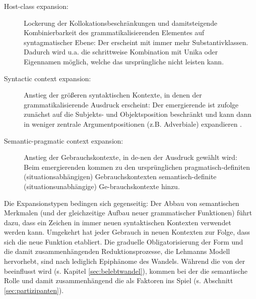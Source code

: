 \begin{description}
\item[Host-class expansion:] Lockerung der Kollokationsbeschränkungen und damit\linebreak steigende Kombinierbarkeit des grammatikalisierenden Elementes auf syntagmatischer Ebene: Der  erscheint mit immer mehr Substantivklassen. Dadurch wird u.a. die schrittweise Kombination mit Unika  oder Eigennamen  möglich, welche das ursprüngliche  nicht leisten kann. 
\item[Syntactic context expansion:] Anstieg  der größeren syntaktischen Kontexte, in denen der grammatikalisierende Ausdruck erscheint: Der emergierende  ist \textcite[32]{Himmelmann2004} zufolge zunächst auf die Subjekts-  und Objektsposition   beschränkt und kann dann in weniger zentrale Argumentpositionen (z.B. Adverbiale)  expandieren  \parencite[s. hierzu auch ausführlich][]{Himmelmann1998}. 
\item[Semantic-pragmatic context expansion:] Anstieg  der Gebrauchskontexte, in de-\linebreak nen der Ausdruck gewählt wird: Beim emergierenden  kommen zu den ursprünglichen pragmatisch-definiten (situationsabhängigen) Gebrauchskontexten semantisch-definite (situationsunabhängige) Ge-\linebreak brauchskontexte hinzu.   

 
\end{description}

\noindent
Die Expansionstypen  bedingen sich gegenseitig: Der Abbau von semantischen Merkmalen (und der gleichzeitige Aufbau neuer grammatischer Funktionen) führt dazu, dass ein Zeichen in immer neuen syntaktischen Kontexten verwendet werden kann. Umgekehrt hat jeder Gebrauch in neuen Kontexten zur Folge, dass sich die neue Funktion etabliert. Die graduelle Obligatorisierung der Form und die damit zusammenhängenden Reduktionsprozesse, die Lehmanns Modell hervorhebt, sind nach \textcite[33]{Himmelmann2004} lediglich Epiphänome des Wandels. Während die   von der   beeinflusst wird (s. Kapitel \ref{sec:belebtwandel}), kommen bei der   die semantische Rolle  und damit zusammenhängend die  als Faktoren ins Spiel (s. Abschnitt \ref{sec:partizipanten}).

